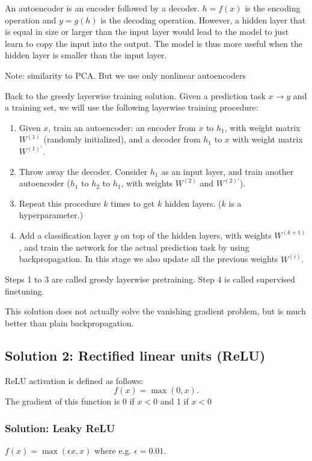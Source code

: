 \documentclass[a4paper,12pt]{article}
\begin{document}
An autoencoder is an encoder followed by a decoder. $h = f(x)$ is the encoding operation and $y = g(h)$ is the decoding operation. However, a hidden layer that is equal in size or larger than the input layer would lead to the model to just learn to copy the input into the output. The model is thus more useful when the hidden layer is smaller than the input layer. 

Note: similarity to PCA. But we use only nonlinear autoencoders

Back to the greedy layerwise training solution. Given a prediction task $x\rightarrow y$ and a training set, we will use the following layerwise training procedure: 
\begin{enumerate}
\item
Given $x$, train an autoencoder: an encoder from $x$ to $h_1$, with weight matrix $W^{(1)}$ (randomly initialized), and a decoder from $h_1$ to $x$ with weight matrix $W^{(1)'}$. 
\item
Throw away the decoder. Consider $h_1$ as an input layer, and train another autoencoder ($h_1$ to $h_2$ to $h_1$, with weights $W^{(2)}$ and $W^{(2)'}$). 
\item
Repeat this procedure $k$ times to get $k$ hidden layers. ($k$ is a hyperparameter.)
\item
Add a classification layer $y$ on top of the hidden layers, with weights $W^{(k+1)}$, and train the network for the actual prediction task by using backpropagation. In this stage we also update all the previous weights $W^{(i)}$. 
\end{enumerate}
Steps 1 to 3 are called greedy layerwise pretraining. Step 4 is called supervised finetuning. 

This solution does not actually solve the vanishing gradient problem, but is much better than plain backpropagation. 

\subsection{Solution 2: Rectified linear units (ReLU)}

ReLU activation is defined as follows: 
$$f(x) = \max(0, x).$$
The gradient of this function is 0 if $x<0$ and 1 if $x<0$

\subsubsection{Solution: Leaky ReLU}

$f(x) = \max (\epsilon x, x)$ where e.g. $\epsilon = 0.01$. 
\end{document}
